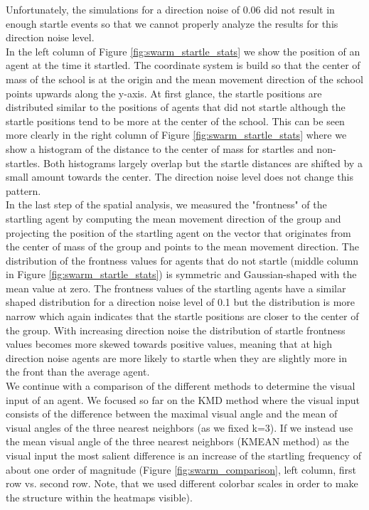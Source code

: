 \documentclass[a4paper,10pt,hidelinks]{scrreprt}
\begin{document}
    Unfortunately, the simulations for a direction noise of 0.06 did not result in enough startle events so that we cannot properly analyze the results for this direction noise level.\\
    In the left column of Figure \ref{fig:swarm_startle_stats} we show the position of an agent at the time it startled.
    The coordinate system is build so that the center of mass of the school is at the origin and the mean movement direction of the school points upwards along the y-axis.
    At first glance, the startle positions are distributed similar to the positions of agents that did not startle although the startle positions tend to be more at the center of the school.
    This can be seen more clearly in the right column of Figure \ref{fig:swarm_startle_stats} where we show a histogram of the distance to the center of mass for startles and non-startles.
    Both histograms largely overlap but the startle distances are shifted by a small amount towards the center.
    The direction noise level does not change this pattern.\\
    In the last step of the spatial analysis, we measured the "frontness" of the startling agent by computing the mean movement direction of the group and projecting the position of the startling agent on the vector that originates from the center of mass of the group and points to the mean movement direction.
    The distribution of the frontness values for agents that do not startle (middle column in Figure \ref{fig:swarm_startle_stats}) is symmetric and Gaussian-shaped with the mean value at zero.
    The frontness values of the startling agents have a similar shaped distribution for a direction noise level of 0.1 but the distribution is more narrow which again indicates that the startle positions are closer to the center of the group.
    With increasing direction noise the distribution of startle frontness values becomes more skewed towards positive values, meaning that at high direction noise agents are more likely to startle when they are slightly more in the front than the average agent.\\
    We continue with a comparison of the different methods to determine the visual input of an agent.
    We focused so far on the KMD method where the visual input consists of the difference between the maximal visual angle and the mean of visual angles of the three nearest neighbors (as we fixed k=3).
    If we instead use the mean visual angle of the three nearest neighbors (KMEAN method) as the visual input the most salient difference is an increase of the startling frequency of about one order of magnitude (Figure \ref{fig:swarm_comparison}, left column, first row vs. second row. Note, that we used different colorbar scales in order to make the structure within the heatmaps visible).
\end{document}

